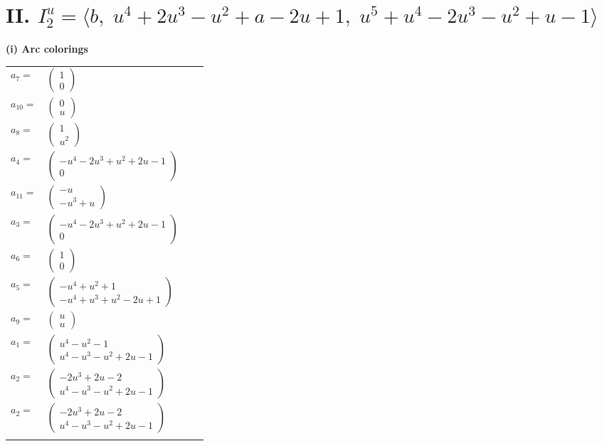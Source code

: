 \documentclass[1p]{elsarticle_modified}
\theoremstyle{definition}
\begin{document}
\centering \section*{II. $I^u_{2}= \langle b,\;u^4+2 u^3- u^2+a-2 u+1,\;u^5+u^4-2 u^3- u^2+u-1 \rangle$}
\flushleft \textbf{(i) Arc colorings}\\
\begin{tabular}{m{7pt} m{180pt} m{7pt} m{180pt} }
\flushright $a_{7}=$&$\begin{pmatrix}1\\0\end{pmatrix}$ \\
\flushright $a_{10}=$&$\begin{pmatrix}0\\u\end{pmatrix}$ \\
\flushright $a_{8}=$&$\begin{pmatrix}1\\u^2\end{pmatrix}$ \\
\flushright $a_{4}=$&$\begin{pmatrix}- u^4-2 u^3+u^2+2 u-1\\0\end{pmatrix}$ \\
\flushright $a_{11}=$&$\begin{pmatrix}- u\\- u^3+u\end{pmatrix}$ \\
\flushright $a_{3}=$&$\begin{pmatrix}- u^4-2 u^3+u^2+2 u-1\\0\end{pmatrix}$ \\
\flushright $a_{6}=$&$\begin{pmatrix}1\\0\end{pmatrix}$ \\
\flushright $a_{5}=$&$\begin{pmatrix}- u^4+u^2+1\\- u^4+u^3+u^2-2 u+1\end{pmatrix}$ \\
\flushright $a_{9}=$&$\begin{pmatrix}u\\u\end{pmatrix}$ \\
\flushright $a_{1}=$&$\begin{pmatrix}u^4- u^2-1\\u^4- u^3- u^2+2 u-1\end{pmatrix}$ \\
\flushright $a_{2}=$&$\begin{pmatrix}-2 u^3+2 u-2\\u^4- u^3- u^2+2 u-1\end{pmatrix}$\\ \flushright $a_{2}=$&$\begin{pmatrix}-2 u^3+2 u-2\\u^4- u^3- u^2+2 u-1\end{pmatrix}$\\&\end{tabular}
\end{document}
